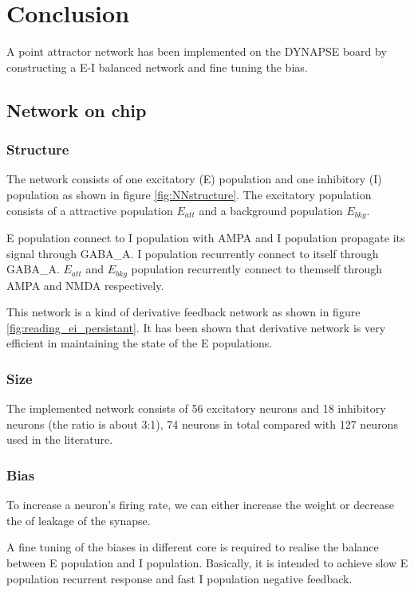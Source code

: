 \chapter{Conclusion}

A point attractor network has been implemented on the DYNAPSE board by constructing a E-I balanced network and fine tuning the bias.

\section{Network on chip}
\subsection*{Structure}
The network consists of one excitatory (E) population and one inhibitory (I) population as shown in figure \ref{fig:NNstructure}. The excitatory population consists of a attractive population $E_{att}$ and a background population $E_{bkg}$.

E population connect to I population with AMPA and I population propagate its signal through GABA\_A.
I population recurrently connect to itself through GABA\_A. $E_{att}$ and $E_{bkg}$ population recurrently connect to themself through AMPA and NMDA respectively.

This network is a kind of derivative feedback network as shown in figure \ref{fig:reading_ei_persistant}. It has been shown that derivative network is very efficient in maintaining the state of the E populations.

\subsection*{Size}
The implemented network consists of 56 excitatory neurons and 18 inhibitory neurons (the ratio is about 3:1), 74 neurons in total compared with 127 neurons used in the literature. 


\subsection*{Bias}
To increase a neuron's firing rate, we can either increase the weight or decrease the of leakage of the synapse.

A fine tuning of the biases in different core is required to realise the balance between E population and I population. Basically, it is intended to achieve slow E population recurrent response and fast I population negative feedback\cite{limBalancedCorticalMicrocircuitry2013}.

